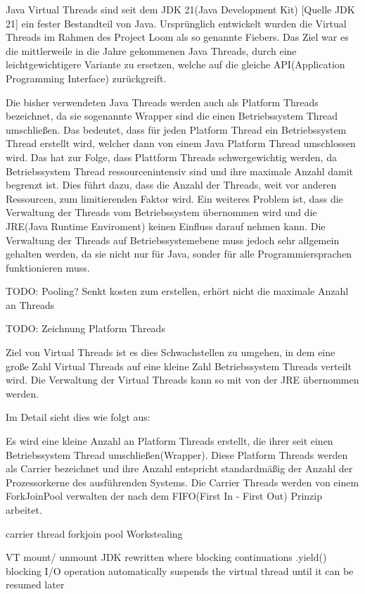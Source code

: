 \documentclass[fontsize=12pt,paper=a4,twoside=semi,parskip=half-,headsepline,headinclude]{scrreprt}
\begin{document}
Java Virtual Threads sind seit dem JDK 21(Java Development Kit) [Quelle JDK 21] ein fester Bestandteil von Java. Ursprünglich entwickelt wurden die Virtual Threads im Rahmen des Project Loom als so genannte Fiebers. Das Ziel war es die mittlerweile in die Jahre gekommenen Java Threads, durch eine leichtgewichtigere Variante zu ersetzen, welche auf die gleiche API(Application Programming Interface) zurückgreift.

Die bisher verwendeten Java Threads werden auch als Platform Threads bezeichnet, da sie sogenannte Wrapper sind die einen Betriebssystem Thread umschließen. Das bedeutet, dass für jeden Platform Thread ein Betriebssystem Thread erstellt wird, welcher dann von einem Java Platform Thread umschlossen wird. Das hat zur Folge, dass Plattform Threads schwergewichtig werden, da Betriebssystem Thread ressourcenintensiv sind und ihre maximale Anzahl damit begrenzt ist. Dies führt dazu, dass die Anzahl der Threads, weit vor anderen Ressourcen, zum limitierenden Faktor wird. Ein weiteres Problem ist, dass die Verwaltung der Threads
vom Betriebssystem übernommen wird und die JRE(Java Runtime Enviroment) keinen Einfluss darauf nehmen kann. Die Verwaltung der Threads auf Betriebssystemebene muss jedoch sehr allgemein gehalten werden, da sie nicht nur für Java, sonder für alle Programmiersprachen funktionieren muss.

TODO: Pooling? Senkt kosten zum erstellen, erhört nicht die maximale Anzahl an Threads

TODO: Zeichnung Platform Threads

Ziel von Virtual Threads ist es dies Schwachstellen zu umgehen, in dem eine große Zahl Virtual Threads auf eine kleine Zahl Betriebssystem Threads verteilt wird. Die Verwaltung der Virtual Threads kann so mit von der JRE übernommen werden.

Im Detail sieht dies wie folgt aus:

Es wird eine kleine Anzahl an Platform Threads erstellt, die ihrer seit einen Betriebssystem Thread umschließen(Wrapper). Diese Platform Threads werden als Carrier bezeichnet und ihre Anzahl entspricht standardmäßig der Anzahl der Prozessorkerne des ausführenden Systems. Die Carrier Threads werden von einem ForkJoinPool verwalten der nach dem FIFO(First In - First Out) Prinzip arbeitet. 

carrier thread
forkjoin pool
Workstealing

VT mount/ unmount
JDK rewritten where blocking
continuations .yield()
blocking I/O operation automatically suspends the virtual thread until it can be resumed later
\end{document}
